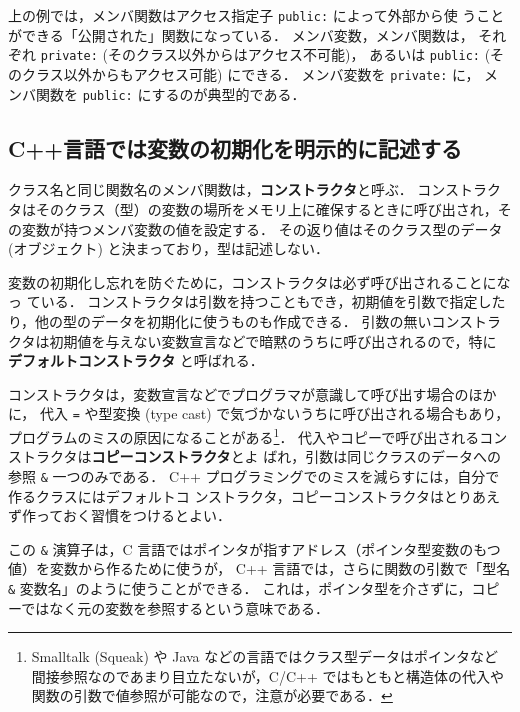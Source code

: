 \documentclass[11pt,a4,epsf]{jarticle}
\begin{document}
上の例では，メンバ関数はアクセス指定子 \verb+public:+ によって外部から使
うことができる「公開された」関数になっている．
メンバ変数，メンバ関数は，
それぞれ \verb+private:+ (そのクラス以外からはアクセス不可能)，
あるいは \verb+public:+ (そのクラス以外からもアクセス可能) にできる．
メンバ変数を \verb+private:+ に，
メンバ関数を \verb+public:+ にするのが典型的である．


\subsection{C++言語では変数の初期化を明示的に記述する}

クラス名と同じ関数名のメンバ関数は，{\bf コンストラクタ}と呼ぶ．
コンストラクタはそのクラス（型）の変数の場所をメモリ上に確保するときに呼び出され，その変数が持つメンバ変数の値を設定する．
その返り値はそのクラス型のデータ (オブジェクト) と決まっており，型は記述しない．

変数の初期化し忘れを防ぐために，コンストラクタは必ず呼び出されることになっ
ている．
コンストラクタは引数を持つこともでき，初期値を引数で指定したり，他の型のデータを初期化に使うものも作成できる．
引数の無いコンストラクタは初期値を与えない変数宣言などで暗黙のうちに呼び出されるので，特に {\bf デフォルトコンストラクタ} と呼ばれる．

コンストラクタは，変数宣言などでプログラマが意識して呼び出す場合のほかに，
代入 \verb+=+ や型変換 (type cast) で気づかないうちに呼び出される場合もあり，プログラムのミスの原因になることがある\footnote{Smalltalk (Squeak) や Java などの言語ではクラス型データはポインタなど
間接参照なのであまり目立たないが，C/C++ ではもともと構造体の代入や関数の引数で値参照が可能なので，注意が必要である．}．
代入やコピーで呼び出されるコンストラクタは{\bf コピーコンストラクタ}とよ
ばれ，引数は同じクラスのデータへの参照 \verb+&+ 一つのみである．
C++ プログラミングでのミスを減らすには，自分で作るクラスにはデフォルトコ
ンストラクタ，コピーコンストラクタはとりあえず作っておく習慣をつけるとよい．

この \verb+&+ 演算子は，C 言語ではポインタが指すアドレス（ポインタ型変数のもつ値）を変数から作るために使うが，
C++ 言語では，さらに関数の引数で「型名 \verb+&+ 変数名」のように使うことができる．
これは，ポインタ型を介さずに，コピーではなく元の変数を参照するという意味である．
\end{document}
